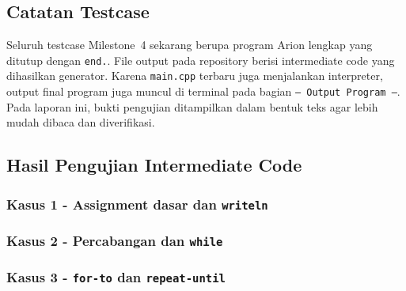\documentclass[11pt,a4paper]{article}
\begin{document}
\subsection{Catatan Testcase}

Seluruh testcase Milestone~4 sekarang berupa program Arion lengkap yang ditutup
dengan \texttt{end.}. File output pada repository berisi intermediate code yang
dihasilkan generator. Karena \texttt{main.cpp} terbaru juga menjalankan
interpreter, output final program juga muncul di terminal pada bagian
\texttt{--- Output Program ---}. Pada laporan ini, bukti pengujian ditampilkan
dalam bentuk teks agar lebih mudah dibaca dan diverifikasi.

\subsection{Hasil Pengujian Intermediate Code}

\subsubsection*{Kasus 1 - Assignment dasar dan \texttt{writeln}}





\subsubsection*{Kasus 2 - Percabangan dan \texttt{while}}





\subsubsection*{Kasus 3 - \texttt{for-to} dan \texttt{repeat-until}}
\end{document}
